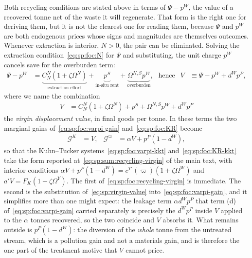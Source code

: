  Both recycling conditions are stated above in terms
of $\Psi-p^W$, the value of a recovered tonne net of the waste it will regenerate. That form is the
right one for deriving them, but it is not the clearest one for reading them, because $\Psi$ and
$p^W$ are both endogenous prices whose signs and magnitudes are themselves outcomes. Whenever
extraction is interior, $N>0$, the pair can be eliminated. Solving the extraction
condition~\eqref{eq:sp:foc:N} for $\Psi$ and substituting, the unit charge $p^W$ cancels save for the
overburden term:
\begin{align}
\Psi-p^W &= \underbrace{C^N_N\left(1+\zeta\Omega^N\right)}_{\text{extraction effort}}
+\underbrace{p^S}_{\text{in-situ rent}}
+\underbrace{\Omega^{N,S}p^W}_{\text{overburden}} ,
&&\text{hence}
&
V &\equiv \Psi-p^W+d^Wp^P ,
\label{eq:sp:virgin-value}
\end{align}
where we name the combination
\begin{align}
V &= C^N_N\left(1+\zeta\Omega^N\right)+p^S+\Omega^{N,S}p^W+d^Wp^P
\label{eq:sp:V}
\end{align}
the \emph{virgin displacement value}, in final goods per tonne. In these terms the two marginal gains
of~\eqref{eq:sp:foc:varpi-gain} and~\eqref{eq:sp:foc:KR} become
\begin{align}
\mathcal G^K &= V,
&
\mathcal G^\varpi &= \alpha V+p^P\left(1-d^W\right),
\label{eq:sp:foc:recycling-virgin}
\end{align}
so that the Kuhn--Tucker systems~\eqref{eq:sp:foc:varpi-kkt} and~\eqref{eq:sp:foc:KR-kkt} take the
form reported at~\eqref{eq:sp:sum:recycling-virgin} of the main text, with interior conditions
$\alpha V+p^P\left(1-d^W\right)=c^{T\prime}\left(\varpi\right)\left(1+\zeta\Omega^W\right)$ and
$a'V=F_K\left(1-\zeta\Omega^Y\right)$.
The first of~\eqref{eq:sp:foc:recycling-virgin} is immediate. The second is the substitution
of~\eqref{eq:sp:virgin-value} into~\eqref{eq:sp:foc:varpi-gain}, and it simplifies more than one might
expect: the leakage term $\alpha d^Wp^P$ that term (d) of~\eqref{eq:sp:foc:varpi-gain} carried separately
is precisely the $d^Wp^P$ inside $V$ applied to the $\alpha$ tonnes recovered, so the two coincide
and $V$ absorbs it. What remains outside is $p^P\left(1-d^W\right)$: the diversion of the
\emph{whole} tonne from the untreated stream, which is a pollution gain and not a materials gain, and
is therefore the one part of the treatment motive that $V$ cannot price.

